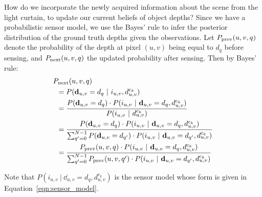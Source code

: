How do we incorporate the newly acquired information about the scene from the light curtain, to update our current beliefs of object depths? Since we have a probabilistic sensor model, we use the Bayes' rule to infer the posterior distribution of the ground truth depths given the observations. Let ${P_\text{prev}(u, v, q)}$ denote the probability of the depth at pixel $(u, v)$ being equal to $d_q$ before sensing, and ${P_\text{next}(u, v, q)}$ the updated probability after sensing. Then by Bayes' rule:
\begin{align*}
   &\after{q} \\
   &\hspace{5pt}= P(\dd_{u, v} = d_q\ |\ i_{u, v}, d^{c_k}_{u, v}) \\
   &\hspace{5pt}= \frac{P(\dd_{u, v} = d_q) \cdot P(i_{u, v}\ |\ \dd_{u, v} = d_q, d^{c_k}_{u, v})}{P(i_{u, v}\ |\ d^{c_k}_{u, v})}\\
   &\hspace{5pt}= \frac{P(\dd_{u, v} = d_q) \cdot P(i_{u, v}\ |\ \dd_{u, v} = d_q, d^{c_k}_{u, v})}{\sum_{\qb=0}^{N-1} P(\dd_{u, v} = d_{\qb}) \cdot P(i_{u, v}\ |\ \dd_{u, v} = d_{\qb}, d^{c_k}_{u, v})}\\
   &\hspace{5pt}= \frac{\before{q} \cdot P(i_{u, v}\ |\ \dd_{u, v} = d_q, d^{c_k}_{u, v})}{\sum_{\qb=0}^{N-1} \before{\qb} \cdot P(i_{u, v}\ |\ \dd_{u, v} = d_{\qb}, d^{c_k}_{u, v})}
\end{align*}

Note that $P(i_{u, v}\ |\ \dd_{u, v} = d_q, d^{c_k}_{u, v})$ is the sensor model whose form is given in Equation~\ref{eqn:sensor_model}.



